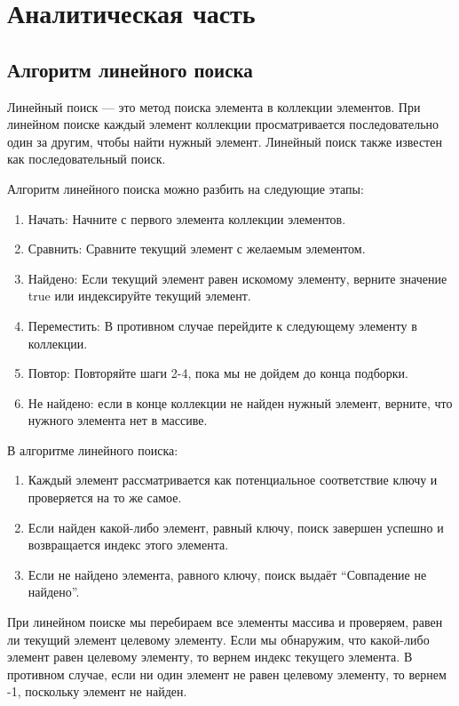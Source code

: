 \section{Аналитическая часть}

\subsection{Алгоритм линейного поиска}

\hspace{1.25cm}
Линейный поиск --- это метод поиска элемента в коллекции элементов. При линейном поиске каждый элемент коллекции просматривается последовательно один за другим, чтобы найти нужный элемент. Линейный поиск также известен как последовательный поиск.

Алгоритм линейного поиска можно разбить на следующие этапы:
\begin{enumerate}
\item Начать: Начните с первого элемента коллекции элементов.
\item Сравнить: Сравните текущий элемент с желаемым элементом.
\item Найдено: Если текущий элемент равен искомому элементу, верните значение true или индексируйте текущий элемент.
\item Переместить: В противном случае перейдите к следующему элементу в коллекции.
\item Повтор: Повторяйте шаги 2-4, пока мы не дойдем до конца подборки.
\item Не найдено: если в конце коллекции не найден нужный элемент, верните, что нужного элемента нет в массиве.
\end{enumerate}

В алгоритме линейного поиска:
\begin{enumerate}
\item Каждый элемент рассматривается как потенциальное соответствие ключу и проверяется на то же самое.
\item Если найден какой-либо элемент, равный ключу, поиск завершен успешно и возвращается индекс этого элемента.
\item Если не найдено элемента, равного ключу, поиск выдаёт “Совпадение не найдено”.
\end{enumerate}

При линейном поиске мы перебираем все элементы массива и проверяем, равен ли текущий элемент целевому элементу. Если мы обнаружим, что какой-либо элемент равен целевому элементу, то вернем индекс текущего элемента. В противном случае, если ни один элемент не равен целевому элементу, то вернем -1, поскольку элемент не найден.

